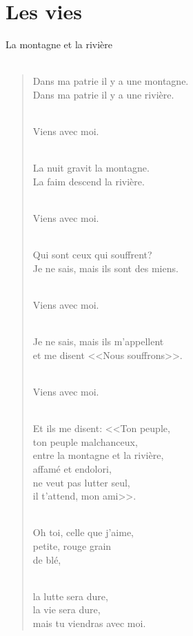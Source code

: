 \documentclass[11pt,a4paper]{book}
\begin{document}
\cleardoublepage

\part{Les vies}

\cleardoublepage

{\huge La montagne et la rivière} \\ \\

\begin{verse}
Dans ma patrie il y a une montagne. \\
Dans ma patrie il y a une rivière. \\ \

Viens avec moi. \\ \

La nuit gravit la montagne. \\
La faim descend la rivière. \\ \

Viens avec moi. \\ \

Qui sont ceux qui souffrent? \\
Je ne sais, mais ils sont des miens. \\ \

Viens avec moi. \\ \

Je ne sais, mais ils m'appellent \\
et me disent <<Nous souffrons>>. \\ \

Viens avec moi. \\ \

Et ils me disent: <<Ton peuple, \\
ton peuple malchanceux, \\
entre la montagne et la rivière, \\
affamé et endolori, \\
ne veut pas lutter seul, \\
il t'attend, mon ami>>. \\ \

Oh toi, celle que j'aime, \\
petite, rouge grain \\
de blé, \\ \

la lutte sera dure, \\
la vie sera dure, \\
mais tu viendras avec moi.
\end{verse}
\end{document}
